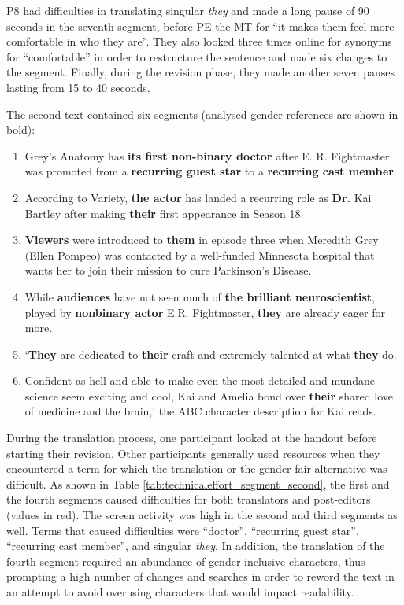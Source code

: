 P8 had difficulties in translating singular \textit{they} and made a long pause of 90 seconds in the seventh segment, before PE the MT for ``it makes them feel more comfortable in who they are''. They also looked three times online for synonyms for ``comfortable'' in order to restructure the sentence and made six changes to the segment. Finally, during the revision phase, they made another seven pauses lasting from 15 to 40 seconds.

The second text contained six segments (analysed gender references are shown in bold):
\begin{enumerate}
\setlength\itemsep{-0.5em}
    \item Grey’s Anatomy has \textbf{its first non-binary doctor} after E. R. Fightmaster was promoted from a \textbf{recurring guest star} to a \textbf{recurring cast member}.
    \item According to Variety, \textbf{the actor} has landed a recurring role as \textbf{Dr.} Kai Bartley after making \textbf{their} first appearance in Season 18.
    \item \textbf{Viewers} were introduced to \textbf{them} in episode three when Meredith Grey (Ellen Pompeo) was contacted by a well-funded Minnesota hospital that wants her to join their mission to cure Parkinson’s Disease. 
    \item While \textbf{audiences} have not seen much of \textbf{the brilliant neuroscientist}, played by \textbf{nonbinary actor} E.R. Fightmaster, \textbf{they} are already eager for more. 
    \item ‘\textbf{They}  are dedicated to \textbf{their}  craft and extremely talented at what \textbf{they} do. 
    \item Confident as hell and able to make even the most detailed and mundane science seem exciting and cool, Kai and Amelia bond over \textbf{their} shared love of medicine and the brain,’ the ABC character description for Kai reads.
\end{enumerate}

During the translation process, one participant looked at the handout before starting their revision. Other participants generally used resources when they encountered a term for which the translation or the gender-fair alternative was difficult. As shown in Table \ref{tab:technicaleffort_segment_second}, the first and the fourth segments caused difficulties for both translators and post-editors (values in red). The screen activity was high in the second and third segments as well. Terms that caused difficulties were ``doctor'', ``recurring guest star'', ``recurring cast member'', and singular \textit{they}. In addition, the translation of the fourth segment required an abundance of gender-inclusive characters, thus prompting a high number of changes and searches in order to reword the text in an attempt to avoid overusing characters that would impact readability. 

